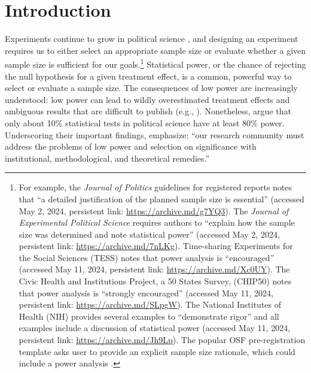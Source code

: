 \documentclass[12pt]{article}
\begin{document}


\thispagestyle{empty}
\newpage

\doublespace

\setcounter{page}{1}


\section*{Introduction}

Experiments continue to grow in political science \citep{Druckman2021}, and designing an experiment requires us to either select an appropriate sample size or evaluate whether a given sample size is sufficient for our goals.\footnote{
  For example, the \emph{Journal of Politics} guidelines for registered reports notes that ``a detailed justification of the planned sample size is essential'' (accessed May 2, 2024, persistent link: \url{https://archive.md/g7YQ3}). 
  The \emph{Journal of Experimental Political Science} requires authors to ``explain how the sample size was determined and note statistical power'' (accessed May 2, 2024, persistent link: \url{https://archive.md/7nLKg}). 
  Time-sharing Experiments for the Social Sciences (TESS) notes that power analysis is ``encouraged'' (accessed May 11, 2024, persistent link: \url{https://archive.md/Xc0UY}). 
  The Civic Health and Institutions Project, a 50 States Survey, (CHIP50) notes that power analysis is ``strongly encouraged'' (accessed May 11, 2024, persistent link: \url{https://archive.md/SLpgW}). 
  The National Institutes of Health (NIH) provides several examples to ``demonstrate rigor'' and all examples include a discussion of statistical power (accessed May 11, 2024, persistent link: \url{https://archive.md/Jh9Lp}). 
  The popular OSF pre-registration template asks user to provide an explicit sample size rationale, which could include a power analysis \citep{Bowman2020}.}
Statistical power, or the chance of rejecting the null hypothesis for a given treatment effect, is a common, powerful way to select or evaluate a sample size.
The consequences of low power are increasingly understood: low power can lead to wildly overestimated treatment effects \citep{Gelman2014} and ambiguous results that are difficult to publish (e.g., \citealt{Alrababah2023}). 
Nonetheless, \cite{ArelBundock2022} argue that only about 10\% statistical tests in political science have at least 80\% power. 
Underscoring their important findings, \cite{ArelBundock2022} emphasize: ``our research community must address the problems of low power and selection on significance with institutional, methodological, and theoretical remedies.''
\end{document}
